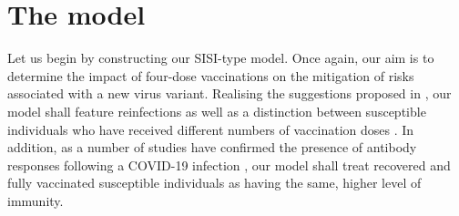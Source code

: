 \documentclass[11pt,reqno]{amsart}
\newcommand{\cR}{\mathcal{R}}
\begin{document}







\section{The model}\label{sec:model}

Let us begin by constructing our SISI-type model. Once again, our aim is to determine the impact of four-dose vaccinations on the mitigation of risks associated with a new virus variant. Realising the suggestions proposed in \cite{OwenHoseanaYong,YongHoseanaOwen2}, our model shall feature reinfections \cite{OwenHoseanaYong} as well as a distinction between susceptible individuals who have received different numbers of vaccination doses \cite{YongHoseanaOwen2}. In addition, as a number of studies have confirmed the presence of antibody responses following a COVID-19 infection \cite{Altawalah,LiEtAl,SwartzEtAl,QiEtAl}, our model shall treat recovered and fully vaccinated susceptible individuals as having the same, higher level of immunity.
\end{document}
